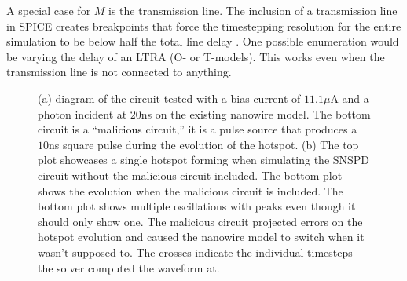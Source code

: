 \documentclass[]{article}
\newcommand{\cf}[1]{\textsf{#1}}
\begin{document}
A special case for $M$ is the transmission line. The inclusion of a transmission line
in SPICE creates breakpoints that force the timestepping resolution for the entire simulation
to be below half the total line delay \cite{hspice, spice-book}. One possible enumeration would
be varying the delay of an \cf{LTRA} (O- or T-models). This works even when the transmission line
is not connected to anything.

\begin{figure}
    \centering
    \caption{(a) diagram of the circuit tested with a bias current of $11.1\mu$A and a photon incident at $20$ns on the existing nanowire model. The bottom circuit is a ``malicious circuit,'' it is a pulse source that produces a $10$ns square pulse during the evolution of the hotspot. (b) The top plot showcases a single hotspot forming when simulating
    the SNSPD circuit without the malicious circuit included. The bottom plot shows the evolution when the malicious circuit
    is included. The bottom plot shows multiple oscillations with peaks even though it should only show one. The
    malicious circuit projected errors on the hotspot evolution and caused the nanowire model to switch when it wasn't supposed to. The crosses indicate the individual timesteps the solver computed the waveform at.}
\end{figure}
\end{document}
